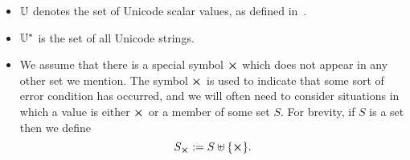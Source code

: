 \begin{itemize}
  \item $\mathbb{U}$ denotes the set of Unicode scalar values, as defined in~\cite[Definition D76]{Unicode-standard}.%

  \item $\mathbb{U}^*$ is the set of all Unicode strings.%

  \item We assume that there is a special symbol $\errorX$ which does not appear
    in any other set we mention.  The symbol $\errorX$ is used to indicate that
    some sort of error condition has occurred, and we will often need to consider
    situations in which a value is either $\errorX$ or a member of some set $S$.
    For brevity, if $S$ is a set then we define
    $$
    \withError{S} := S \disj \{\errorX\}.
    $$%
\end{itemize}%

